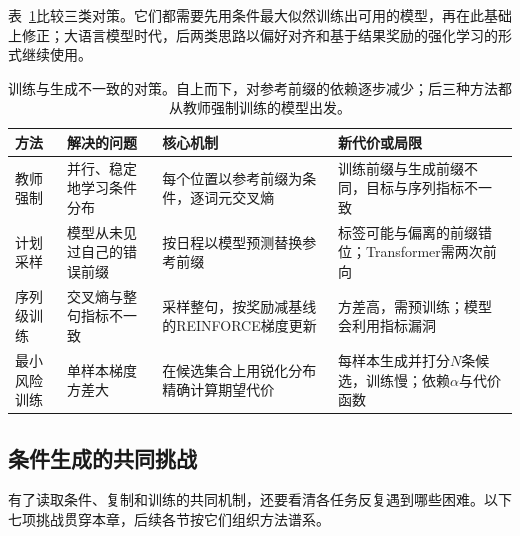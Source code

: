 表~\ref{tab:nlp-generation-exposure-methods}比较三类对策。它们都需要先用条件最大似然训练出可用的模型，再在此基础上修正；大语言模型时代，后两类思路以偏好对齐和基于结果奖励的强化学习的形式继续使用。

\begin{table}[htbp]
  \centering
  \small
  \begin{tabularx}{\linewidth}{@{}>{\raggedright\arraybackslash}p{22mm}
    >{\raggedright\arraybackslash}X>{\raggedright\arraybackslash}X
    >{\raggedright\arraybackslash}X@{}}
    \toprule
    方法 & 解决的问题 & 核心机制 & 新代价或局限 \\
    \midrule
    教师强制 & 并行、稳定地学习条件分布 & 每个位置以参考前缀为条件，逐词元交叉熵 & 训练前缀与生成前缀不同，目标与序列指标不一致 \\
    计划采样 & 模型从未见过自己的错误前缀 & 按日程以模型预测替换参考前缀 & 标签可能与偏离的前缀错位；Transformer需两次前向 \\
    序列级训练 & 交叉熵与整句指标不一致 & 采样整句，按奖励减基线的REINFORCE梯度更新 & 方差高，需预训练；模型会利用指标漏洞 \\
    最小风险训练 & 单样本梯度方差大 & 在候选集合上用锐化分布精确计算期望代价 & 每样本生成并打分$N$条候选，训练慢；依赖$\alpha$与代价函数 \\
    \bottomrule
  \end{tabularx}
  \caption{训练与生成不一致的对策。自上而下，对参考前缀的依赖逐步减少；后三种方法都从教师强制训练的模型出发。}
  \label{tab:nlp-generation-exposure-methods}
\end{table}

\subsection{条件生成的共同挑战}
\label{sec:nlp-generation-challenges}

有了读取条件、复制和训练的共同机制，还要看清各任务反复遇到哪些困难。以下七项挑战贯穿本章，后续各节按它们组织方法谱系。

